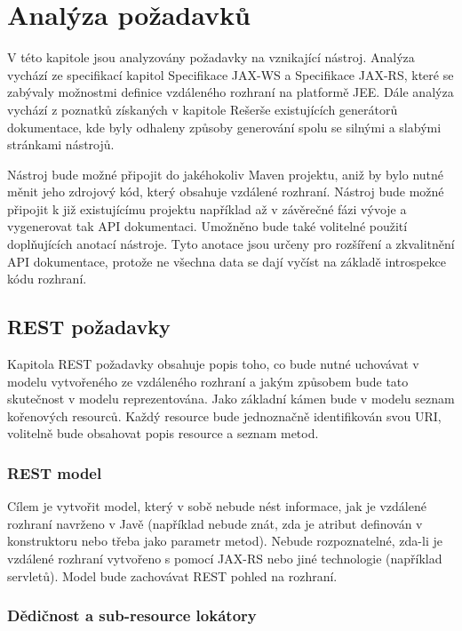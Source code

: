 \documentclass[11pt,twoside,a4paper]{book}
\begin{document}
\section{Analýza požadavků}

V této kapitole jsou analyzovány požadavky na vznikající nástroj. Analýza vychází ze
specifikací kapitol Specifikace JAX-WS a Specifikace JAX-RS, které se zabývaly možnostmi
definice vzdáleného rozhraní na platformě JEE. Dále analýza vychází z poznatků získaných v
kapitole Rešerše existujících generátorů dokumentace, kde byly odhaleny způsoby generování
spolu se silnými a slabými stránkami nástrojů.

Nástroj bude možné připojit do jakéhokoliv Maven projektu, aniž by bylo nutné měnit jeho
zdrojový kód, který obsahuje vzdálené rozhraní. Nástroj bude možné připojit k již
existujícímu projektu například až v závěrečné fázi vývoje a vygenerovat tak API
dokumentaci. Umožněno bude také volitelné použití doplňujících anotací nástroje. Tyto
anotace jsou určeny pro rozšíření a zkvalitnění API dokumentace, protože ne všechna data se
dají vyčíst na základě introspekce kódu rozhraní.

\subsection{REST požadavky}

Kapitola REST požadavky obsahuje popis toho, co bude nutné uchovávat v modelu
vytvořeného ze vzdáleného rozhraní a jakým způsobem bude tato skutečnost v modelu
reprezentována. Jako základní kámen bude v modelu seznam kořenových resourců. Každý
resource bude jednoznačně identifikován svou URI, volitelně bude obsahovat popis resource a
seznam metod.

\subsubsection{REST model}

Cílem je vytvořit model, který v sobě nebude nést informace, jak je vzdálené rozhraní
navrženo v Javě (například nebude znát, zda je atribut definován v konstruktoru nebo třeba
jako parametr metod). Nebude rozpoznatelné, zda-li je vzdálené rozhraní vytvořeno s pomocí
JAX-RS nebo jiné technologie (například servletů). Model bude zachovávat REST pohled na
rozhraní.

\subsubsection{Dědičnost a sub-resource lokátory}
\end{document}
